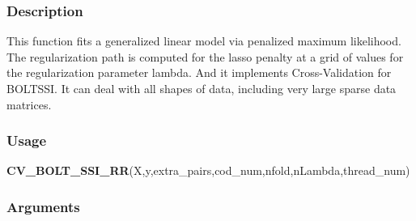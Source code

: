 \documentclass[]{article}
\newenvironment{Shaded}{\begin{snugshade}}{\end{snugshade}}
\newcommand{\KeywordTok}[1]{\textcolor[rgb]{0.13,0.29,0.53}{\textbf{#1}}}
\newcommand{\NormalTok}[1]{#1}
\begin{document}
\subsubsection{Description}\label{description-1}

This function fits a generalized linear model via penalized maximum
likelihood. The regularization path is computed for the lasso penalty at
a grid of values for the regularization parameter lambda. And it
implements Cross-Validation for BOLTSSI. It can deal with all shapes of
data, including very large sparse data matrices.

\subsubsection{Usage}\label{usage-1}

\begin{Shaded}
\begin{Highlighting}[]
\KeywordTok{CV_BOLT_SSI_RR}\NormalTok{(X,y,extra_pairs,cod_num,nfold,nLambda,thread_num)}
\end{Highlighting}
\end{Shaded}

\subsubsection{Arguments}\label{arguments-1}
\end{document}
